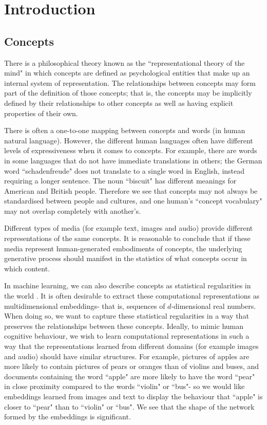 \chapter{Introduction}

\section{Concepts}

There is a philosophical theory known as the ``representational theory of the mind" \cite{stanfordconcepts} in which concepts are defined as psychological entities that make up an internal system of representation. The relationships between concepts may form part of the definition of those concepts; that is, the concepts may be implicitly defined by their relationships to other concepts as well as having explicit properties of their own. 

There is often a one-to-one mapping between concepts and words (in human natural language). However, the different human languages often have different levels of expressiveness when it comes to concepts. For example, there are words in some languages that do not have immediate translations in others; the German word ``schadenfreude" does not translate to a single word in English, instead requiring a longer sentence. The noun ``biscuit" has different meanings for American and British people. Therefore we see that concepts may not always be standardised between people and cultures, and one human's ``concept vocabulary" may not overlap completely with another's. 

Different types of media (for example text, images and audio) provide different representations of the same concepts. It is reasonable to conclude that if these media represent human-generated embodiments of concepts, the underlying generative process should manifest in the statistics of what concepts occur in which content. 

In machine learning, we can  also describe concepts as statistical regularities in the world \cite{RoadsLoveNatureMachineIntelligence}. It is often desirable to extract these computational representations as multidimensional embeddings- that is, sequences of $d$-dimensional real numbers. When doing so, we want to capture these statistical regularities in a way that preserves the relationships between these concepts. Ideally, to mimic human cognitive behaviour, we wish to learn computational representations in such a way that the representations learned from different domains (for example images and audio) should have similar structures. For example, pictures of apples are more likely to contain pictures of pears or oranges than of violins and buses, and documents containing the word ``apple" are more likely to have the word ``pear" in close proximity compared to the words ``violin" or ``bus"- so we would like embeddings learned from images and text to display the behaviour that ``apple" is closer to ``pear" than to ``violin" or ``bus". We see that the shape of the network formed by the embeddings is significant. 

